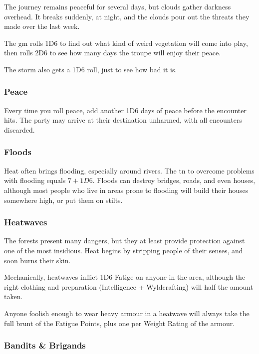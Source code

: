 \begin{multicols}{2}
\begin{exampletext}
  The journey remains peaceful for several days, but clouds gather darkness overhead.
  It breaks suddenly, at night, and the clouds pour out the threats they made over the last week.
\end{exampletext}

The \gls{gm} rolls 1D6 to find out what kind of weird vegetation will come into play, then rolls 2D6 to see how many days the troupe will enjoy their peace.

The storm also gets a 1D6 roll, just to see how bad it is.

\subsubsection{Peace}

Every time you roll peace, add another 1D6 days of peace before the encounter hits.
The party may arrive at their destination unharmed, with all encounters discarded.

\subsubsection{Floods}

Heat often brings flooding, especially around rivers.
The \gls{tn} to overcome problems with flooding equals $7 + 1D6$.
Floods can destroy bridges, roads, and even houses, although most people who live in areas prone to flooding will build their houses somewhere high, or put them on stilts.

\subsubsection{Heatwaves}

The forests present many dangers, but they at least provide protection against one of the most insidious.
Heat begins by stripping people of their senses, and soon burns their skin.

Mechanically, heatwaves inflict 1D6 Fatige on anyone in the area, although the right clothing and preparation (Intelligence + Wyldcrafting) will half the amount taken.

Anyone foolish enough to wear heavy armour in a heatwave will always take the full brunt of the Fatigue Points, plus one per Weight Rating of the armour.

\subsubsection{Bandits \& Brigands}


\end{multicols}
